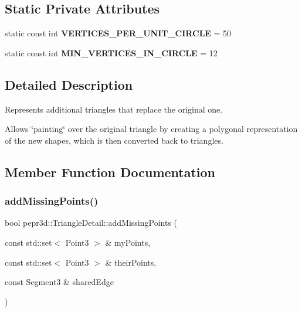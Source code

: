 \subsection*{Static Private Attributes}
\begin{DoxyCompactItemize}
\item 
\mbox{\label{classpepr3d_1_1_triangle_detail_af3b751ca10e1e87e63d49d58f1e6d142}} 
static const int {\bfseries V\+E\+R\+T\+I\+C\+E\+S\+\_\+\+P\+E\+R\+\_\+\+U\+N\+I\+T\+\_\+\+C\+I\+R\+C\+LE} = 50
\item 
\mbox{\label{classpepr3d_1_1_triangle_detail_ac9259653e0e58901b931ef725df2eb49}} 
static const int {\bfseries M\+I\+N\+\_\+\+V\+E\+R\+T\+I\+C\+E\+S\+\_\+\+I\+N\+\_\+\+C\+I\+R\+C\+LE} = 12
\end{DoxyCompactItemize}


\subsection{Detailed Description}
Represents additional triangles that replace the original one. 

Allows \char`\"{}painting\char`\"{} over the original triangle by creating a polygonal representation of the new shapes, which is then converted back to triangles. 

\subsection{Member Function Documentation}
\mbox{\label{classpepr3d_1_1_triangle_detail_a9d193b7c01d33c650b58738aed37e0e6}} 
\subsubsection{\texorpdfstring{addMissingPoints()}{addMissingPoints()}}
{\footnotesize\ttfamily bool pepr3d\+::\+Triangle\+Detail\+::add\+Missing\+Points (\begin{DoxyParamCaption}\item[{const std\+::set$<$ Point3 $>$ \&}]{my\+Points,  }\item[{const std\+::set$<$ Point3 $>$ \&}]{their\+Points,  }\item[{const Segment3 \&}]{shared\+Edge }\end{DoxyParamCaption})\hspace{0.3cm}{\ttfamily [private]}}



